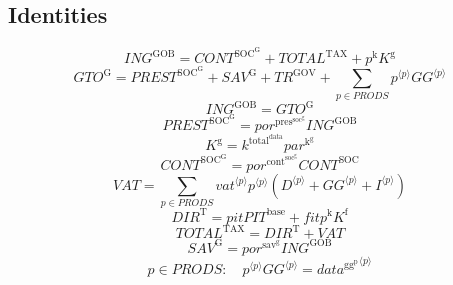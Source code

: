 \subsection{Identities}

\begin{equation}
{I\!N\!G}^{\mathrm{GOB}} = {C\!O\!N\!T}^{\mathrm{SOC}^{\mathrm{G}}} + {T\!O\!T\!A\!L}^{\mathrm{TAX}} + {p^{\mathrm{k}}} {K^{\mathrm{g}}}
\end{equation}
\begin{equation}
{G\!T\!O}^{\mathrm{G}} = {P\!R\!E\!S\!T}^{\mathrm{SOC}^{\mathrm{G}}} + {S\!A\!V}^{\mathrm{G}} + {T\!R}^{\mathrm{GOV}} + \sum_{p\in {P\!R\!O\!D\!S}} {{p}^{\langle p\rangle}} {{{G\!G}}^{\langle p\rangle}}
\end{equation}
\begin{equation}
{I\!N\!G}^{\mathrm{GOB}} = {G\!T\!O}^{\mathrm{G}}
\end{equation}
\begin{equation}
{P\!R\!E\!S\!T}^{\mathrm{SOC}^{\mathrm{G}}} = {{p\!o\!r}^{\mathrm{pres}^{\mathrm{soc}^{\mathrm{g}}}}} {{I\!N\!G}^{\mathrm{GOB}}}
\end{equation}
\begin{equation}
K^{\mathrm{g}} = {k^{\mathrm{total}^{\mathrm{data}}}} {{p\!a\!r}^{\mathrm{k}^{\mathrm{g}}}}
\end{equation}
\begin{equation}
{C\!O\!N\!T}^{\mathrm{SOC}^{\mathrm{G}}} = {{p\!o\!r}^{\mathrm{cont}^{\mathrm{soc}^{\mathrm{g}}}}} {{C\!O\!N\!T}^{\mathrm{SOC}}}
\end{equation}
\begin{equation}
{V\!A\!T} = \sum_{p\in {P\!R\!O\!D\!S}} {{{v\!a\!t}}^{\langle p\rangle}} {{p}^{\langle p\rangle}} \left({D}^{\langle p\rangle} + {{G\!G}}^{\langle p\rangle} + {I}^{\langle p\rangle}\right)
\end{equation}
\begin{equation}
{D\!I\!R}^{\mathrm{T}} = {{p\!i\!t}} {{P\!I\!T}^{\mathrm{base}}} + {{f\!i\!t}} {p^{\mathrm{k}}} {K^{\mathrm{f}}}
\end{equation}
\begin{equation}
{T\!O\!T\!A\!L}^{\mathrm{TAX}} = {D\!I\!R}^{\mathrm{T}} + {V\!A\!T}
\end{equation}
\begin{equation}
{S\!A\!V}^{\mathrm{G}} = {{p\!o\!r}^{\mathrm{sav}^{\mathrm{g}}}} {{I\!N\!G}^{\mathrm{GOB}}}
\end{equation}
\begin{equation}
p\in {P\!R\!O\!D\!S}\colon\quad {{p}^{\langle p\rangle}} {{{G\!G}}^{\langle p\rangle}} = {{d\!a\!t\!a}^{\mathrm{gg}^{\mathrm{p}}}}^{\langle p\rangle}
\end{equation}




